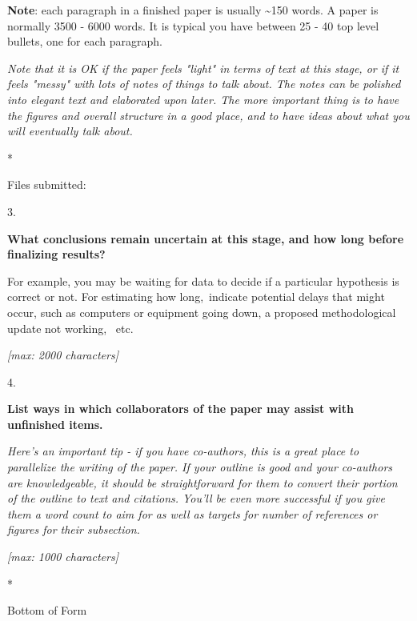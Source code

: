 \documentclass[]{article}
\begin{document}
\textbf{Note}: each paragraph in a finished paper is usually
\textasciitilde{}150 words. A paper is normally 3500 - 6000 words. It is
typical you have between 25 - 40 top level bullets, one for each
paragraph.

\emph{Note that it is OK if the paper feels "light" in terms of text at
this stage, or if it feels "messy" with lots of notes of things to talk
about. The notes can be polished into elegant text and elaborated upon
later. The more important thing is to have the figures and overall
structure in a good place, and to have ideas about what you will
eventually talk about.}

*

Files submitted:

3.

\textbf{What conclusions remain uncertain at this stage, and how long
before finalizing results?}

For example, you may be waiting for data to decide if a particular
hypothesis is correct or not. For estimating how long,~indicate
potential delays that might occur, such as computers or equipment going
down, a proposed methodological update not working, ~etc.

\emph{{[}max: 2000 characters{]}}

4.

\textbf{List ways in which collaborators of the paper may assist with
unfinished items.}

\emph{Here's an important tip - if you have co-authors, this is a great
place to parallelize the writing of the paper. If your outline is good
and your co-authors are knowledgeable, it should be straightforward for
them to convert their portion of the outline to text and citations.
You'll be even more successful if you give them a word count to aim for
as well as targets for number of references or figures for their
subsection.}

\emph{{[}max: 1000 characters{]}}

*

Bottom of Form
\end{document}
